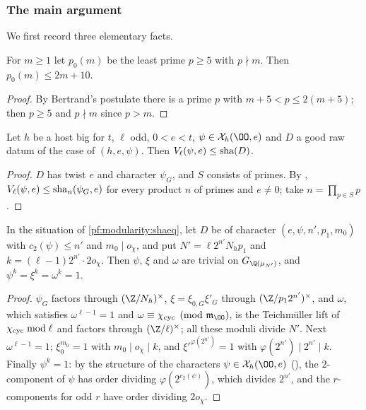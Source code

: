 \subsubsection{The main argument}\label{sec:pf:modularity:mainarg}

We first record three elementary facts.

\begin{lemma}\label{pf:modularity:pzero}
For $m\ge1$ let $p_0(m)$ be the least prime $p\ge5$ with $p\nmid m$. Then $p_0(m)\le2m+10$.
\end{lemma}

\begin{proof}
By Bertrand's postulate there is a prime $p$ with $m+5<p\le2(m+5)$; then $p\ge5$ and $p\nmid m$ since $p>m$.
\end{proof}

\begin{lemma}\label{pf:modularity:shaeq}
Let $h$ be a host big for $t$, $\ell$ odd, $0<e<t$, $\psi\in\mathcal X_h(\OO,e)$ and $D$ a good raw datum of the case of
$(h,e,\psi)$. Then $V_\ell(\psi,e)\le\mathrm{sha}(D)$.
\end{lemma}

\begin{proof}
$D$ has twist $e$ and character $\psi_G$, and $S$ consists of primes. By ,
$V_\ell(\psi,e)\le\mathrm{sha}_n(\psi_G,e)$ for every product $n$ of primes and $e\ne0$; take $n=\prod_{p\in S}p$.
\end{proof}

\begin{lemma}\label{pf:modularity:levof}
In the situation of \cref{pf:modularity:shaeq}, let $D$ be of character $(e,\psi,n',p_1,m_0)$ with $c_2(\psi)\le n'$ and
$m_0\mid o_\chi$, and put $N'=\ell2^{n'}N_hp_1$ and $k=(\ell-1)2^{n'}\cdot2o_\chi$. Then $\psi$, $\xi$ and $\omega$ are
trivial on $G_{\Q(\mu_{N'})}$, and $\psi^k=\xi^k=\omega^k=1$.
\end{lemma}

\begin{proof}
$\psi_G$ factors through $(\Z/N_h)^\times$, $\xi=\xi_{0,G}\xi'_G$ through $(\Z/p_12^{n'})^\times$, and $\omega$, which
satisfies $\omega^{\ell-1}=1$ and $\omega\equiv\modularitycyc\pmod{\mathfrak m_\OO}$, is the Teichm\"uller lift of
$\chi_{\mathrm{cyc}}\bmod\ell$ and factors through $(\Z/\ell)^\times$; all these moduli divide $N'$. Next
$\omega^{\ell-1}=1$; $\xi_0^{m_0}=1$ with $m_0\mid o_\chi\mid k$, and $\xi'^{\varphi(2^{n'})}=1$ with
$\varphi(2^{n'})\mid2^{n'}\mid k$. Finally $\psi^k=1$: by the structure of the characters $\psi\in\mathcal X_h(\OO,e)$
(), the $2$-component of $\psi$ has order dividing $\varphi(2^{c_2(\psi)})$, which
divides $2^{n'}$, and the $r$-components for odd $r$ have order dividing $2o_\chi$.
\end{proof}

